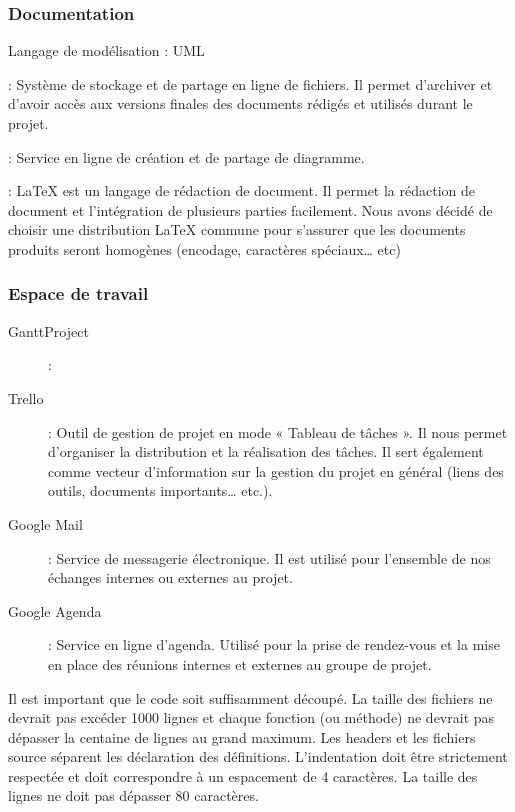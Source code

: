 \documentclass[10pt,a4paper]{article}
\begin{document}
\subsubsection{Documentation}
\begin{description}
\item * Langage de modélisation : UML
\item [Google Drive] : Système de stockage et de partage en ligne de fichiers. Il permet d'archiver et d'avoir accès aux versions finales des documents rédigés et utilisés durant le projet. 
\item [Cacoo] : Service en ligne de création et de partage de diagramme.
\item [LaTeX - TexMaker] : LaTeX est un langage de rédaction de document. Il permet la rédaction de document et l'intégration de plusieurs parties facilement. Nous avons décidé de choisir une distribution LaTeX commune pour s'assurer que les documents produits seront homogènes (encodage, caractères spéciaux… etc)
\end{description}

\subsubsection{Espace de travail}
\begin{description}
\item [GanttProject] :
\item [Trello] : Outil de gestion de projet en mode « Tableau de tâches ». Il nous permet d'organiser la distribution et la réalisation des tâches. Il sert également comme vecteur d'information sur la gestion du projet en général (liens des outils, documents importants… etc.).
\item [Google Mail] : Service de messagerie électronique. Il est utilisé pour l’ensemble de nos échanges internes ou externes au projet.
\item [Google Agenda] : Service en ligne d'agenda. Utilisé pour la prise de rendez-vous et la mise en place des réunions internes et externes au groupe de projet. 
\end{description}
 

Il est important que le code soit suffisamment découpé. La taille des fichiers ne devrait pas excéder 1000 lignes et chaque fonction (ou méthode) ne devrait pas dépasser la centaine de lignes au grand maximum. Les headers et les fichiers source séparent les déclaration des définitions.
L'indentation doit être strictement respectée et doit correspondre à un espacement de 4 caractères.
La taille des lignes ne doit pas dépasser 80 caractères.
\end{document}
